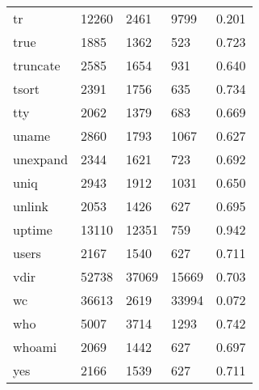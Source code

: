 \begin{longtable}{lp{4.5cm}p{4.5cm}p{4.5cm}p{4.5cm}}
tr        &                    12260 &         2461 &          9799 &                    0.201 \\
true      &                     1885 &         1362 &           523 &                    0.723 \\
truncate  &                     2585 &         1654 &           931 &                    0.640 \\
tsort     &                     2391 &         1756 &           635 &                    0.734 \\
tty       &                     2062 &         1379 &           683 &                    0.669 \\
uname     &                     2860 &         1793 &          1067 &                    0.627 \\
unexpand  &                     2344 &         1621 &           723 &                    0.692 \\
uniq      &                     2943 &         1912 &          1031 &                    0.650 \\
unlink    &                     2053 &         1426 &           627 &                    0.695 \\
uptime    &                    13110 &        12351 &           759 &                    0.942 \\
users     &                     2167 &         1540 &           627 &                    0.711 \\
vdir      &                    52738 &        37069 &         15669 &                    0.703 \\
wc        &                    36613 &         2619 &         33994 &                    0.072 \\
who       &                     5007 &         3714 &          1293 &                    0.742 \\
whoami    &                     2069 &         1442 &           627 &                    0.697 \\
yes       &                     2166 &         1539 &           627 &                    0.711 \\
\end{longtable}

